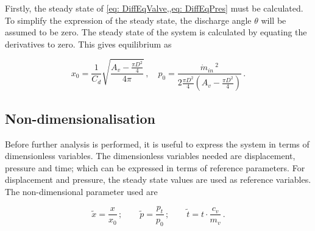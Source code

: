 
Firstly, the steady state of \cref{eq: DiffEqValve,,eq: DiffEqPres} must be calculated. To simplify the expression of the steady state, the discharge angle $\theta$ will be assumed to be zero. The steady state of the system is calculated by equating the derivatives to zero. This gives equilibrium as

\begin{equation*}
    x_0 = \frac{1}{C_d} \sqrt{\frac{A_v - \frac{\pi D^2}{4}}{4 \pi}}
    \, , \quad
    p_0 = \frac{\dot{m}_{in} \,^2}{2 \frac{\pi D^2}{4} \left( A_v - \frac{\pi D^2}{4} \right)} \, .
\end{equation*}



\subsection{Non-dimensionalisation}

Before further analysis is performed, it is useful to express the system in terms of dimensionless variables. The dimensionless variables needed are displacement, pressure and time; which can be expressed in terms of reference parameters. For displacement and pressure, the steady state values are used as reference variables. The non-dimensional parameter used are

\begin{equation*}
    \tilde{x} = \frac{x}{x_{0}} \, ; \qquad
    \tilde{p} = \frac{p_t}{p_{0}} \, ; \qquad 
    \tilde{t} = t \cdot \frac{c_v}{m_v} \, .
\end{equation*}



